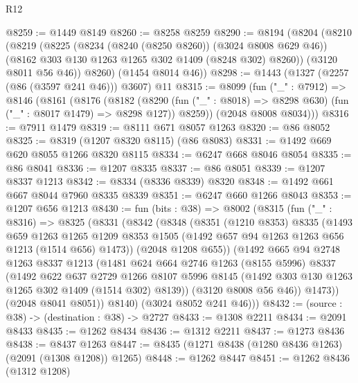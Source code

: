 \begin{lexlean}{R12}
\begin{coremodule}
@8259 := @1449 @8149
@8260 := @8258 @8259
@8290 := @8194
    (@8204
      (@8210
        (@8219
          (@8225
            (@8234 (@8240 (@8250 @8260)) (@3024 @8008 @629 @46))
            (@8162 @303 @130 @1263 @1265 @302 @1409 (@8248 @302) @8260))
          (@3120 @8011 @56 @46))
        @8260)
      (@1454 @8014 @46))
@8298 := @1443 (@1327 (@2257 (@86 (@3597 @241 @46))) @3607) @11
@8315 := @8099
    (fun ("_" : @7912) =>
    @8146
      (@8161
        (@8176
          (@8182
            (@8290 (fun ("_" : @8018) => @8298 @630) (fun ("_" : @8017 @1479) => @8298 @127))
            @8259))
        (@2048 @8008 @8034)))
@8316 := @7911 @1479
@8319 := @8111 @671 @8057 @1263
@8320 := @86 @8052
@8325 := @8319 (@1207 @8320 @8115) (@86 @8083)
@8331 := @1492 @669 @620 @8055 @1266 @8320 @8115
@8334 := @6247 @668 @8046 @8054
@8335 := @86 @8041
@8336 := @1207 @8335
@8337 := @86 @8051
@8339 := @1207 @8337 @1213
@8342 := @8334 (@8336 @8339) @8320
@8348 := @1492 @661 @667 @8044 @7960 @8335 @8339
@8351 := @6247 @660 @1266 @8043
@8353 := @1207 @656 @1213
@8430 := fun (bits : @38) =>
  @8002
    (@8315
      (fun ("_" : @8316) =>
      @8325
        (@8331
          (@8342
            (@8348
              (@8351
                (@1210 @8353)
                @8335
                (@1493
                  @659
                  @1263
                  @1265
                  @1209
                  @8353
                  @1505
                  (@1492 @657 @94 @1263 @1263 @656 @1213 (@1514 @656) @1473))
                (@2048 @1208 @655))
              (@1492
                @665
                @94
                @2748
                @1263
                @8337
                @1213
                (@1481
                  @624
                  @664
                  @2746
                  @1263
                  (@8155 @5996)
                  @8337
                  (@1492
                    @622
                    @637
                    @2729
                    @1266
                    @8107
                    @5996
                    @8145
                    (@1492 @303 @130 @1263 @1265 @302 @1409 (@1514 @302) @8139))
                  (@3120 @8008 @56 @46))
                @1473))
            (@2048 @8041 @8051))
          @8140)
        (@3024 @8052 @241 @46)))
@8432 := (source : @38) -> (destination : @38) -> @2727
@8433 := @1308 @2211
@8434 := @2091 @8433
@8435 := @1262 @8434
@8436 := @1312 @2211
@8437 := @1273 @8436
@8438 := @8437 @1263
@8447 := @8435 (@1271 @8438 (@1280 @8436 @1263) (@2091 (@1308 @1208)) @1265)
@8448 := @1262 @8447
@8451 := @1262 @8436 (@1312 @1208)

\end{coremodule}
\end{lexlean}
